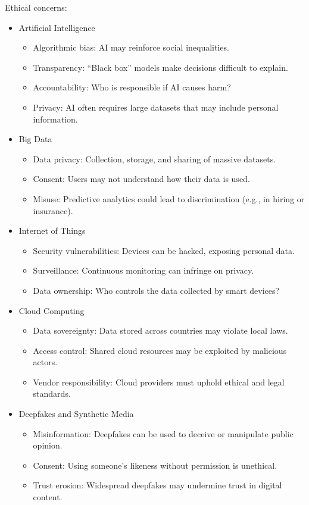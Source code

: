 Ethical concerns:

\begin{itemize}
    \item Artificial Intelligence
        \begin{itemize}
            \item Algorithmic bias: AI may reinforce social inequalities.
            \item Transparency: “Black box” models make decisions difficult to explain.
            \item Accountability: Who is responsible if AI causes harm?
            \item Privacy: AI often requires large datasets that may include personal information.
        \end{itemize}
    \item Big Data
        \begin{itemize}
            \item Data privacy: Collection, storage, and sharing of massive datasets.
            \item Consent: Users may not understand how their data is used.
            \item Misuse: Predictive analytics could lead to discrimination (e.g., in hiring or insurance).
        \end{itemize}
    \item Internet of Things
        \begin{itemize}
            \item Security vulnerabilities: Devices can be hacked, exposing personal data.
            \item Surveillance: Continuous monitoring can infringe on privacy.
            \item Data ownership: Who controls the data collected by smart devices?
        \end{itemize}
    \item Cloud Computing
        \begin{itemize}
            \item Data sovereignty: Data stored across countries may violate local laws.
            \item Access control: Shared cloud resources may be exploited by malicious actors.
            \item Vendor responsibility: Cloud providers must uphold ethical and legal standards.
        \end{itemize}
    \item Deepfakes and Synthetic Media
        \begin{itemize}
            \item Misinformation: Deepfakes can be used to deceive or manipulate public opinion.
            \item Consent: Using someone’s likeness without permission is unethical.
            \item Trust erosion: Widespread deepfakes may undermine trust in digital content.
        \end{itemize}
\end{itemize}

